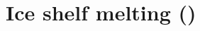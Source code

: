 \documentclass[../tex_main/NEMO_manual]{subfiles}
\begin{document}
%



\section{Ice shelf melting (\protect{})}
\label{sec:SBC_isf}
\end{document}

